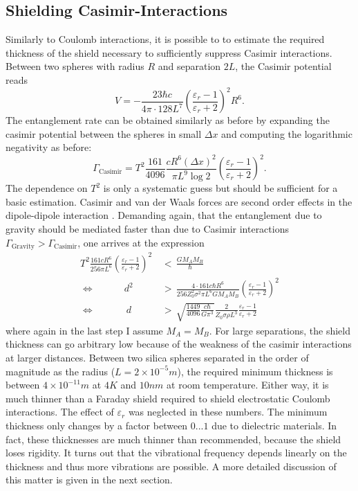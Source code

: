 \subsection{Shielding Casimir-Interactions}
Similarly to Coulomb interactions, it is possible to to estimate the required thickness of the shield necessary to sufficiently suppress Casimir interactions. Between two spheres with radius $R$ and separation $2L$, the Casimir potential reads \cite{Emig_2007}
\begin{equation}
  V = -\frac{23 \hbar c}{4\pi \cdot 128 L^7} \left( \frac{\varepsilon_r - 1}{\varepsilon_r + 2} \right)^2 R^6 .
\end{equation}
The entanglement rate can be obtained similarly as before by expanding the casimir potential between the spheres in small $\Delta x$ and computing the logarithmic negativity as before:
\begin{equation}
  \Gamma_\mathrm{Casimir} = T^2 \frac{161}{4096} \frac{c R^6 (\Delta x)^2}{\pi L^9 \log 2}\left( \frac{\varepsilon_r - 1}{\varepsilon_r + 2}\right)^2 .
\end{equation}
The dependence on $T^2$ is only a systematic guess but should be sufficient for a basic estimation. Casimir and van der Waals forces are second order effects in the dipole-dipole interaction \cite{Bordag_2001}.
Demanding again, that the entanglement due to gravity should be mediated faster than due to Casimir interactions $\Gamma_\mathrm{Gravity} > \Gamma_\mathrm{Casimir}$, one arrives at the expression
\begin{align}
  T^2 \frac{161 c R^6}{256 \pi L^6} \left( \frac{\varepsilon_r - 1}{\varepsilon_r + 2}\right)^2 \, &< \, \frac{G M_A M_B}{\hbar} \\
  \Longleftrightarrow \quad\quad\quad d^2 \, &> \, \frac{4 \cdot 161 c \hbar R^6}{256 Z_0^2 \sigma^2 \pi L^6 G M_A M_B} \left( \frac{\varepsilon_r - 1}{\varepsilon_r + 2}\right)^2 \\
  \Longleftrightarrow \quad\quad\quad\  d \, &> \, \sqrt{\frac{1449}{4096} \frac{c \hbar}{G \pi^3}} \frac{2}{Z_0 \sigma \rho L^3} \frac{\varepsilon_r - 1}{\varepsilon_r + 2}
\end{align}
where again in the last step I assume $M_A = M_B$. For large separations, the shield thickness can go arbitrary low because of the weakness of the casimir interactions at larger distances. Between two silica spheres separated in the order of magnitude as the radius ($L = 2\times 10^{-5}\si{m}$), the required minimum thickness is between $4\times 10^{-11}\si{m}$ at $4\si{K}$ and $10 \si{nm}$ at room temperature.
Either way, it is much thinner than a Faraday shield required to shield electrostatic Coulomb interactions. The effect of $\varepsilon_r$ was neglected in these numbers. The minimum thickness only changes by a factor between $0...1$ due to dielectric materials.
In fact, these thicknesses are much thinner than recommended, because the shield loses rigidity.
It turns out that the vibrational frequency depends linearly on the thickness and thus more vibrations are possible. A more detailed discussion of this matter is given in the next section.


